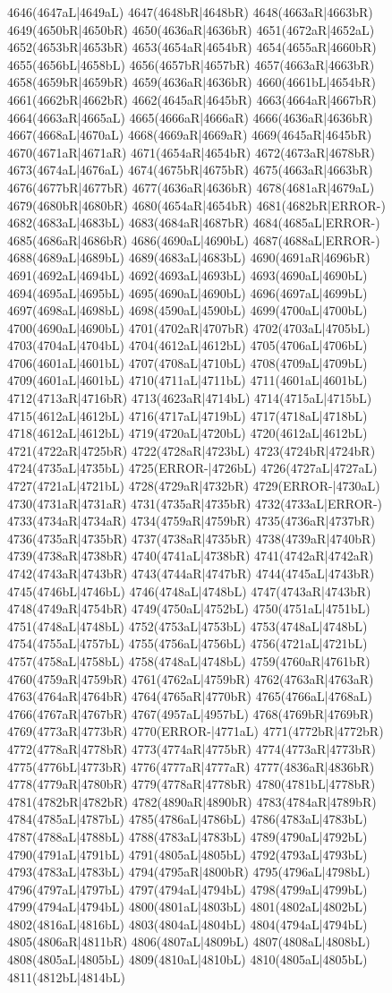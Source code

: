 4646(4647aL|4649aL) 4647(4648bR|4648bR) 4648(4663aR|4663bR) 4649(4650bR|4650bR) 4650(4636aR|4636bR) 4651(4672aR|4652aL) 4652(4653bR|4653bR) 4653(4654aR|4654bR) 4654(4655aR|4660bR) 4655(4656bL|4658bL) 4656(4657bR|4657bR) 4657(4663aR|4663bR) 4658(4659bR|4659bR) 4659(4636aR|4636bR) 4660(4661bL|4654bR) 4661(4662bR|4662bR) 4662(4645aR|4645bR) 4663(4664aR|4667bR) 4664(4663aR|4665aL) 4665(4666aR|4666aR) 4666(4636aR|4636bR) 4667(4668aL|4670aL) 4668(4669aR|4669aR) 4669(4645aR|4645bR) 4670(4671aR|4671aR) 4671(4654aR|4654bR) 4672(4673aR|4678bR) 4673(4674aL|4676aL) 4674(4675bR|4675bR) 4675(4663aR|4663bR) 4676(4677bR|4677bR) 4677(4636aR|4636bR) 4678(4681aR|4679aL) 4679(4680bR|4680bR) 4680(4654aR|4654bR) 4681(4682bR|ERROR-) 4682(4683aL|4683bL) 4683(4684aR|4687bR) 4684(4685aL|ERROR-) 4685(4686aR|4686bR) 4686(4690aL|4690bL) 4687(4688aL|ERROR-) 4688(4689aL|4689bL) 4689(4683aL|4683bL) 4690(4691aR|4696bR) 4691(4692aL|4694bL) 4692(4693aL|4693bL) 4693(4690aL|4690bL) 4694(4695aL|4695bL) 4695(4690aL|4690bL) 4696(4697aL|4699bL) 4697(4698aL|4698bL) 4698(4590aL|4590bL) 4699(4700aL|4700bL) 4700(4690aL|4690bL) 4701(4702aR|4707bR) 4702(4703aL|4705bL) 4703(4704aL|4704bL) 4704(4612aL|4612bL) 4705(4706aL|4706bL) 4706(4601aL|4601bL) 4707(4708aL|4710bL) 4708(4709aL|4709bL) 4709(4601aL|4601bL) 4710(4711aL|4711bL) 4711(4601aL|4601bL) 4712(4713aR|4716bR) 4713(4623aR|4714bL) 4714(4715aL|4715bL) 4715(4612aL|4612bL) 4716(4717aL|4719bL) 4717(4718aL|4718bL) 4718(4612aL|4612bL) 4719(4720aL|4720bL) 4720(4612aL|4612bL) 4721(4722aR|4725bR) 4722(4728aR|4723bL) 4723(4724bR|4724bR) 4724(4735aL|4735bL) 4725(ERROR-|4726bL) 4726(4727aL|4727aL) 4727(4721aL|4721bL) 4728(4729aR|4732bR) 4729(ERROR-|4730aL) 4730(4731aR|4731aR) 4731(4735aR|4735bR) 4732(4733aL|ERROR-) 4733(4734aR|4734aR) 4734(4759aR|4759bR) 4735(4736aR|4737bR) 4736(4735aR|4735bR) 4737(4738aR|4735bR) 4738(4739aR|4740bR) 4739(4738aR|4738bR) 4740(4741aL|4738bR) 4741(4742aR|4742aR) 4742(4743aR|4743bR) 4743(4744aR|4747bR) 4744(4745aL|4743bR) 4745(4746bL|4746bL) 4746(4748aL|4748bL) 4747(4743aR|4743bR) 4748(4749aR|4754bR) 4749(4750aL|4752bL) 4750(4751aL|4751bL) 4751(4748aL|4748bL) 4752(4753aL|4753bL) 4753(4748aL|4748bL) 4754(4755aL|4757bL) 4755(4756aL|4756bL) 4756(4721aL|4721bL) 4757(4758aL|4758bL) 4758(4748aL|4748bL) 4759(4760aR|4761bR) 4760(4759aR|4759bR) 4761(4762aL|4759bR) 4762(4763aR|4763aR) 4763(4764aR|4764bR) 4764(4765aR|4770bR) 4765(4766aL|4768aL) 4766(4767aR|4767bR) 4767(4957aL|4957bL) 4768(4769bR|4769bR) 4769(4773aR|4773bR) 4770(ERROR-|4771aL) 4771(4772bR|4772bR) 4772(4778aR|4778bR) 4773(4774aR|4775bR) 4774(4773aR|4773bR) 4775(4776bL|4773bR) 4776(4777aR|4777aR) 4777(4836aR|4836bR) 4778(4779aR|4780bR) 4779(4778aR|4778bR) 4780(4781bL|4778bR) 4781(4782bR|4782bR) 4782(4890aR|4890bR) 4783(4784aR|4789bR) 4784(4785aL|4787bL) 4785(4786aL|4786bL) 4786(4783aL|4783bL) 4787(4788aL|4788bL) 4788(4783aL|4783bL) 4789(4790aL|4792bL) 4790(4791aL|4791bL) 4791(4805aL|4805bL) 4792(4793aL|4793bL) 4793(4783aL|4783bL) 4794(4795aR|4800bR) 4795(4796aL|4798bL) 4796(4797aL|4797bL) 4797(4794aL|4794bL) 4798(4799aL|4799bL) 4799(4794aL|4794bL) 4800(4801aL|4803bL) 4801(4802aL|4802bL) 4802(4816aL|4816bL) 4803(4804aL|4804bL) 4804(4794aL|4794bL) 4805(4806aR|4811bR) 4806(4807aL|4809bL) 4807(4808aL|4808bL) 4808(4805aL|4805bL) 4809(4810aL|4810bL) 4810(4805aL|4805bL) 4811(4812bL|4814bL) 